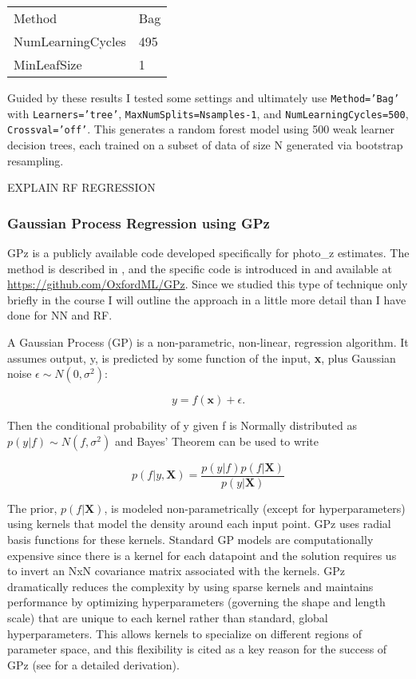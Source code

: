 \documentclass[13pt]{amsart}
\newcommand{\bx}{\textbf{x}}
\newcommand{\bX}{\textbf{X}}
\newcommand{\equ}[1]{\[#1\]}
\newcommand{\nequ}[2]{\begin{equation}#1 \label{#2}\end{equation}}
\newcommand{\equin}[1]{\(#1\)}
\begin{document}
        \begin{table}[H]
        \begin{tabular}{ll}
          Method            & Bag \\
          NumLearningCycles & 495 \\
          MinLeafSize       & 1
        \end{tabular}
        \end{table}

        Guided by these results I tested some settings and ultimately use \texttt{Method='Bag'} with \texttt{Learners='tree'}, \texttt{MaxNumSplits=Nsamples-1}, and \texttt{NumLearningCycles=500}, \texttt{Crossval='off'}. This generates a random forest model using 500 weak learner decision trees, each trained on a subset of data of size N generated via bootstrap resampling.

        EXPLAIN RF REGRESSION



    \subsubsection{Gaussian Process Regression using GPz}
      \label{gpz}

      GPz is a publicly available code developed specifically for photo\_z estimates. The method is described in \cite{sgp}, and the specific code is introduced in \cite{gpz} and available at \url{https://github.com/OxfordML/GPz}. Since we studied this type of technique only briefly in the course I will outline the approach in a little more detail than I have done for NN and RF.

      A Gaussian Process (GP) is a non-parametric, non-linear, regression algorithm. It assumes output, y, is predicted by some function of the input, \bx, plus Gaussian noise \equin{\epsilon \sim N(0,\sigma^2)}:

      \equ{y = f(\bx)+ \epsilon.}

      Then the conditional probability of y given f is Normally distributed as
      \equin{p(y|f) \sim N(f,\sigma^2)} and Bayes' Theorem can be used to write

      \nequ{p(f|y,\bX) = \frac{p(y|f) p(f|\bX)}{p(y|\bX)}}{equ:cond}

      The prior, \equin{p(f|\bX)}, is modeled non-parametrically (except for hyperparameters) using kernels that model the density around each input point. GPz uses radial basis functions for these kernels. Standard GP models are computationally expensive since there is a kernel for each datapoint and the solution requires us to invert an NxN covariance matrix associated with the kernels. GPz dramatically reduces the complexity by using sparse kernels and maintains performance by optimizing hyperparameters (governing the shape and length scale) that are unique to each kernel rather than standard, global hyperparameters. This allows kernels to specialize on different regions of parameter space, and this flexibility is cited as a key reason for the success of GPz (see \cite{sgp} for a detailed derivation).
\end{document}
